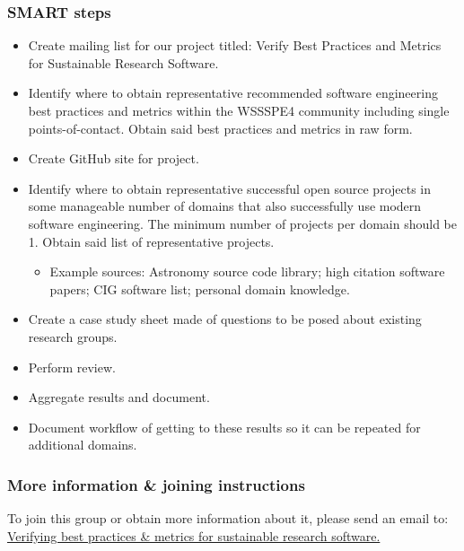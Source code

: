 \subsubsection{SMART steps}

\begin{itemize}
\item Create mailing list for our project titled:  Verify Best Practices and Metrics for Sustainable Research Software.
\item Identify where to obtain representative recommended software engineering best practices and metrics within the WSSSPE4 community including single points-of-contact.  Obtain said best practices and metrics in raw form.
\item Create GitHub site for project.
\item Identify where to obtain representative successful open source projects in some manageable number of domains that also successfully use modern software engineering.  The minimum number of projects per domain should be 1. Obtain said list of representative projects.

\begin{itemize}
\item Example sources: Astronomy source code library; high citation software papers; CIG software list; personal domain knowledge.
\end{itemize}

\item Create a case study sheet made of questions to be posed about existing research groups.
\item Perform review.
\item Aggregate results and document.  
\item Document workflow of getting to these results so it can be repeated for additional domains.
\end{itemize}


\subsubsection{More information \& joining instructions}

To join this group or obtain more information about it, please send an email to: \href{wssspe4-verify-best-practices@googlegroups.com}{Verifying best practices \& metrics for sustainable research software.}
